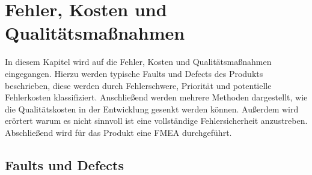 \section{Fehler, Kosten und Qualitätsmaßnahmen}

In diesem Kapitel wird auf die Fehler, Kosten und Qualitätsmaßnahmen eingegangen.
Hierzu werden typische Faults und Defects des Produkts beschrieben, diese werden durch Fehlerschwere, Priorität und potentielle Fehlerkosten klassifiziert. 
Anschließend werden mehrere Methoden dargestellt, wie die Qualitätskosten in der Entwicklung gesenkt werden können.
Außerdem wird erörtert warum es nicht sinnvoll ist eine vollständige Fehlersicherheit anzustreben.
Abschließend wird für das Produkt eine \ac{FMEA} durchgeführt.

\subsection{Faults und Defects}





